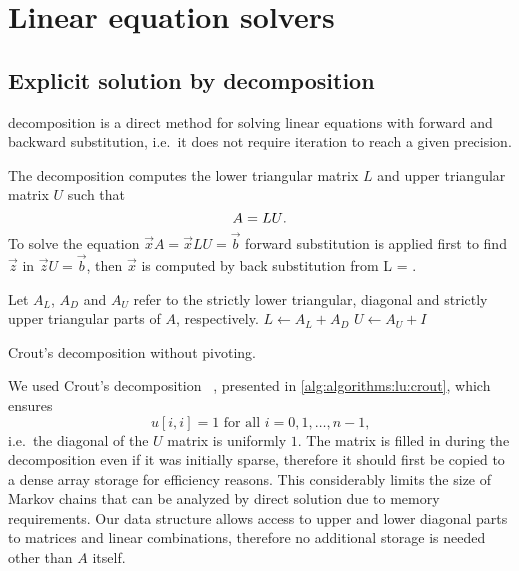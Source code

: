\section{Linear equation solvers}
\label{sec:algorithms:solvers}

\subsection{Explicit solution by  decomposition}
\label{ssec:algorithms:lu}

 decomposition is a direct method for solving linear
equations with forward and backward substitution, i.e.~it does not
require iteration to reach a given precision.

The decomposition computes the lower triangular matrix $L$ and upper
triangular matrix $U$ such that
\begin{equation}
  A = LU \text.
\end{equation}
To solve the equation $\vec{x} A = \vec{x} LU = \vec{b}$ forward
substitution is applied first to find $\vec{z}$ in
$\vec{z} U = \vec{b}$, then $\vec{x}$ is computed by back substitution
from  L = \text.

\begin{algorithm}
  Let $A_L$, $A_D$ and $A_U$ refer to the strictly lower triangular,
  diagonal and strictly upper triangular parts of $A$, respectively.\;
  $L \gets A_L + A_D$\;
  $U \gets A_U + I$\;
  \;
  \caption{Crout's  decomposition without pivoting.}
  \label{alg:algorithms:lu:crout}
\end{algorithm}

We used Crout's  decomposition%
~\citep[Section~2.3.1]{press2007numerical}, presented in
\vref{alg:algorithms:lu:crout}, which ensures
\begin{equation}
  u[i, i] = 1 \text{ for all $i = 0, 1, \ldots, n - 1$,}
\end{equation}
i.e.~the diagonal of the $U$ matrix is uniformly $1$. The matrix is
filled in during the decomposition even if it was initially sparse,
therefore it should first be copied to a dense array storage for
efficiency reasons. This considerably limits the size of Markov chains that
can be analyzed by direct solution due to memory requirements. Our
data structure allows access to upper and lower diagonal parts to
matrices and linear combinations, therefore no additional storage is
needed other than $A$ itself.

